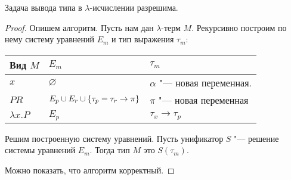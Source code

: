 \begin{theorem}
    Задача вывода типа в $\lambda$-исчислении разрешима.
\end{theorem}

\begin{proof}
    Опишем алгоритм. Пусть нам дан $\lambda$-терм $M$. Рекурсивно построим по нему систему уравнений $E_m$ и тип выражения $\tau_m$:
    \begin{center}
    \begin{tabular}{l l l} \toprule
        Вид $M$         & $E_m$                                                 & $\tau_m$                        \\ \midrule
        $x$             & $\varnothing$                                         & $\alpha$ "--- новая переменная. \\ \midrule
        $PR$            & $E_p \cup E_r \cup \left\{\tau_p=\tau_r\rightarrow\pi\right\}$ & $\pi$ "--- новая переменная     \\ \midrule
        $\lambda x . P$ & $E_p$                                                 & $\tau_x\rightarrow\tau_p$       \\ \bottomrule
    \end{tabular}
    \end{center}
    Решим построенную систему уравнений.
    Пусть унификатор $S$ "--- решение системы уравнений $E_m$. Тогда тип $M$ это $S(\tau_m)$.

    Можно показать, что алгоритм корректный.
\end{proof}

\begin{example}
    \todo %
\end{example}

%
